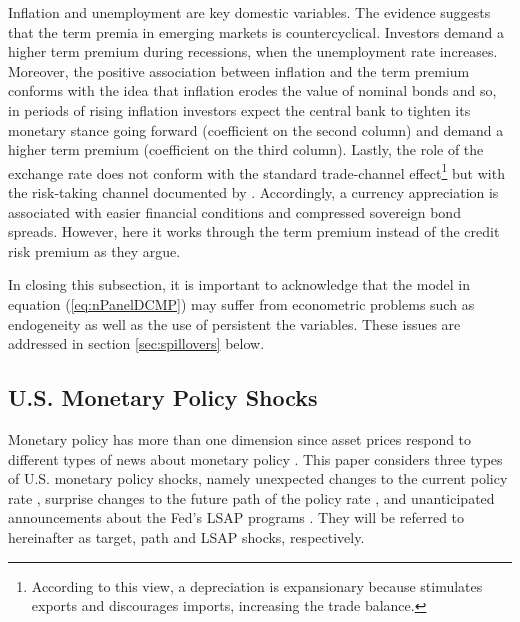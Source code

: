 {Inflation and unemployment are key domestic variables.
The evidence suggests that the term premia in emerging markets is countercyclical.
Investors demand a higher term premium during recessions, when the unemployment rate increases. 
Moreover, the positive association between inflation and the term premium conforms with the idea that inflation erodes the value of nominal bonds and so, in periods of rising inflation investors expect the central bank to tighten its monetary stance going forward (coefficient on the second column) and demand a higher term premium (coefficient on the third column). 
Lastly, the role of the exchange rate does not conform with the standard trade-channel effect\footnote{ According to this view, a depreciation is expansionary because stimulates exports and discourages imports, increasing the trade balance.} but with the risk-taking channel 
documented by \cite{HofmannShimShin:2017}.
Accordingly, a currency appreciation is associated with easier financial conditions and compressed sovereign bond spreads.
However, here it works through the term premium instead of the credit risk premium as they argue.

In closing this subsection, it is important to acknowledge that the model in equation (\ref{eq:nPanelDCMP}) may suffer from econometric problems such as endogeneity as well as the use of persistent the variables.
These issues are addressed in section \ref{sec:spillovers} below.


\subsection{U.S. Monetary Policy Shocks}
\iftoggle{toclinks}{\gototoc}{} %

Monetary policy has more than one dimension since asset prices respond to different types of news about monetary policy \citep{GSS:2005a,Swanson:2018}.
This paper considers three types of U.S. monetary policy shocks, namely
unexpected changes to the current policy rate \citep{Kuttner:2001}, surprise changes to the future path of the policy rate \citep{GSS:2005a}, and unanticipated announcements about the Fed's LSAP programs \citep{Swanson:2018}. 
They will be referred to hereinafter as target, path and LSAP shocks, respectively.

}
